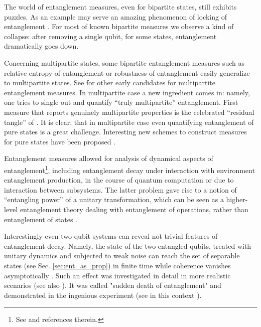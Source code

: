 \documentclass[twocolumn,aps,rmp]{revtex4}
\begin{document}
The world of entanglement measures, even for bipartite states, still
exhibits puzzles. As an example may serve an amazing phenomenon of
locking of entanglement \cite{lock-ent}. For most of known bipartite
measures we observe a kind of collapse: after removing a single qubit,
for some states, entanglement dramatically goes down.

Concerning multipartite states, some bipartite entanglement measures
such as relative entropy of entanglement or robustness of entanglement
\cite{VidalT1998-robustness} easily generalize to multipartite
states. See \cite{EisertB2000-Schmidt,BarnumL2001-multi} for other
early candidates for multipartite entanglement measures.  In
multipartite case a new ingredient comes in: namely, one tries to
single out and quantify ``truly multipartite'' entanglement.  First
measure that reports genuinely multipartite properties is the
celebrated ``residual tangle'' of \cite{CoffmanKW-tangle}.  It is
clear, that in multipartite case even quantifying entanglement of pure
states is a great challenge. Interesting new schemes to construct
measures for pure states have been proposed
\cite{VerstraeteDM2001-normal,Miyake2002-hyper}.

Entanglement measures allowed for analysis of dynamical aspects of
entanglement\footnote{See \cite {AmicoFOV2007,Yu-Eberly05} and references therein.}, including entanglement decay under interaction with environment
\cite{ZyczkowskiHHH2000-dynamics,FicekT2006,Miranowicz2,EberlyY1,JakobczykJ2004,CarvalhoMPB2005_ent_decoh,DoddH2004,WangBPS2006,Montangero2004,Ban2006,ShrestaADH2005,MintertCKB2005-review,KimLAK2002,YiS1999,MaloyerK2006}
entanglement production, in the course of quantum computation
\cite{ParkerPlenio,KendonMunro} or due to interaction between
subsystems. The latter problem gave rise to a notion of ``entangling
power'' \cite{ZanardiZF2000-entpower,LindenSW2005-entpower} of a
unitary transformation, which can be seen as a higher-level
entanglement theory dealing with entanglement of operations, rather
than entanglement of states
\cite{EJPP02,LindenSW2005-entpower,CLP00,HarrowShor2005}.


Interestingly even two-qubit systems can reveal not trivial features of entanglement decay. Namely, the state of the two entangled qubits, treated with unitary dynamics and subjected to weak noise can reach the set of separable states (see Sec. \ref{sec:ent_as_prop}) in finite time while coherence vanishes asymptotically \cite{ZyczkowskiHHH2000-dynamics}. Such an effect was investigated in detail in more realistic scenarios \cite {FicekT2006,EberlyY1,JakobczykJ2004,DoddH2004,WangBPS2006,YuE2007,TolkunovPA2005,LastraRLSR2007,VaglicaV2007} (see also \cite{JordanSS-ent-change2007}). It was  called "sudden death of entanglement" \cite {EberlyY2} and demonstrated in the ingenious experiment \cite {AlmeidaMHSWRD2007} (see in this context \cite {SantosMDZ2006}).
\end{document}
